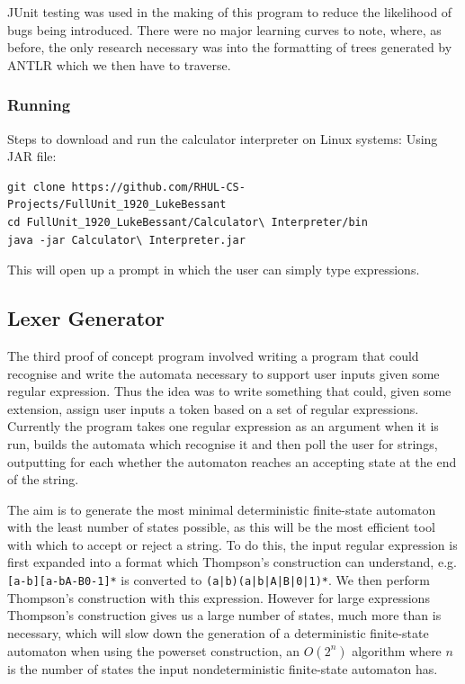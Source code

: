 \documentclass[a4paper, 11pt]{article}
\begin{document}
JUnit testing was used in the making of this program to reduce the likelihood of bugs being introduced. There were no major learning curves to note, where, as before, the only research necessary was into the formatting of trees generated by ANTLR which we then have to traverse. 
\subsubsection{Running}
Steps to download and run the calculator interpreter on Linux systems: Using JAR file:
\begin{verbatim}
git clone https://github.com/RHUL-CS-Projects/FullUnit_1920_LukeBessant
cd FullUnit_1920_LukeBessant/Calculator\ Interpreter/bin
java -jar Calculator\ Interpreter.jar
\end{verbatim}
This will open up a prompt in which the user can simply type expressions.

\subsection{Lexer Generator}
The third proof of concept program involved writing a program that could recognise and write the automata necessary to support user inputs given some regular expression. Thus the idea was to write something that could, given some extension, assign user inputs a token based on a set of regular expressions. Currently the program takes one regular expression as an argument when it is run, builds the automata which recognise it and then poll the user for strings, outputting for each whether the automaton reaches an accepting state at the end of the string.

The aim is to generate the most minimal deterministic finite-state automaton with the least number of states possible, as this will be the most efficient tool with which to accept or reject a string. To do this, the input regular expression is first expanded into a format which Thompson's construction can understand, e.g. \texttt{[a-b][a-bA-B0-1]*} is converted to \texttt{(a|b)(a|b|A|B|0|1)*}. We then perform Thompson's construction with this expression. However for large expressions Thompson's construction gives us a large number of states, much more than is necessary, which will slow down the generation of a deterministic finite-state automaton when using the powerset construction, an $O(2^n)$ algorithm where $n$ is the number of states the input nondeterministic finite-state automaton has.
\end{document}

